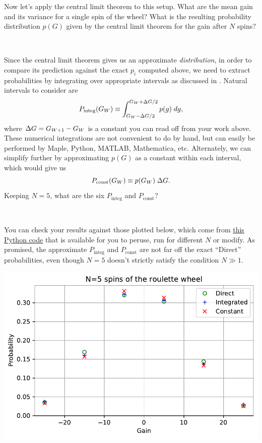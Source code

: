 Now let's apply the central limit theorem to this setup.
What are the mean gain and its variance for a single spin of the wheel?
What is the resulting probability distribution $p(G)$ given by the central limit theorem for the gain after $N$ spins?
\begin{mdframed}
  \ \\[100 pt]
\end{mdframed}
Since the central limit theorem gives us an approximate \textit{distribution}, in order to compare its prediction against the exact $p_i$ computed above, we need to extract probabilities by integrating over appropriate intervals as discussed in .
Natural intervals to consider are
\begin{equation*}
  P_{\text{integ}}(G_W) \equiv \int_{G_W - \Delta G / 2}^{G_W + \Delta G / 2} p(g) \; dg,
\end{equation*}
where $\Delta G = G_{W + 1} - G_W$ is a constant you can read off from your work above.
These numerical integrations are not convenient to do by hand, but can easily be performed by Maple, Python, MATLAB, Mathematica, etc.
Alternately, we can simplify further by approximating $p(G)$ as a constant within each interval, which would give us
\begin{equation*}
  P_{\text{const}}(G_W) \equiv p(G_W) \; \Delta G.
\end{equation*}
Keeping $N = 5$, what are the six $P_{\text{integ}}$ and $P_{\text{const}}$?
\begin{mdframed}
  \ \\[100 pt]
\end{mdframed}
You can check your results against those plotted below, which come from \href{https://github.com/daschaich/MATH327_2022/blob/master/lecture_notes/unit01_prob.py}{this Python code} that is available for you to peruse, run for different $N$ or modify.
As promised, the approximate $P_{\text{integ}}$ and $P_{\text{const}}$ are not far off the exact ``Direct'' probabilities, even though $N = 5$ doesn't strictly satisfy the condition $N \gg 1$.
\begin{center}
  \includegraphics[width=\textwidth]{figs/unit01_roulette_prob.pdf}
\end{center}



